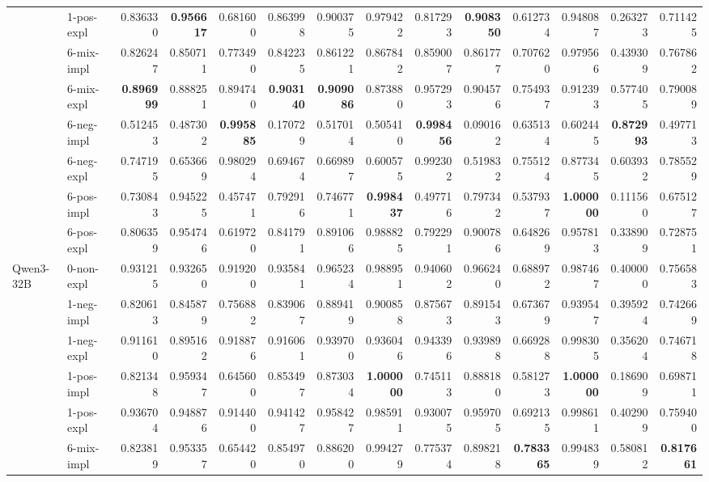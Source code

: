 \begin{tabular}{ll|rrrr|rrrr|rrrr}
 & 1-pos-expl & 0.836330 & \bfseries 0.956617 & 0.681600 & 0.863998 & 0.900375 & 0.979422 & 0.817293 & \bfseries 0.908350 & 0.612734 & 0.948087 & 0.263273 & 0.711425 \\
 & 6-mix-impl & 0.826247 & 0.850711 & 0.773490 & 0.842235 & 0.861221 & 0.867842 & 0.859007 & 0.861777 & 0.707620 & 0.979566 & 0.439309 & 0.767862 \\
 & 6-mix-expl & \bfseries 0.896999 & 0.888251 & 0.894740 & \bfseries 0.903140 & \bfseries 0.909086 & 0.873880 & 0.957293 & 0.904576 & 0.754937 & 0.912393 & 0.577405 & 0.790089 \\
 & 6-neg-impl & 0.512453 & 0.487302 & \bfseries 0.995885 & 0.170729 & 0.517014 & 0.505410 & \bfseries 0.998456 & 0.090162 & 0.635134 & 0.602445 & \bfseries 0.872993 & 0.497713 \\
 & 6-neg-expl & 0.747195 & 0.653669 & 0.980294 & 0.694674 & 0.669897 & 0.600575 & 0.992302 & 0.519832 & 0.755124 & 0.877345 & 0.603932 & 0.785529 \\
 & 6-pos-impl & 0.730843 & 0.945225 & 0.457471 & 0.792916 & 0.746771 & \bfseries 0.998437 & 0.497716 & 0.797342 & 0.537937 & \bfseries 1.000000 & 0.111560 & 0.675127 \\
 & 6-pos-expl & 0.806359 & 0.954746 & 0.619720 & 0.841791 & 0.891066 & 0.988825 & 0.792291 & 0.900786 & 0.648269 & 0.957813 & 0.338909 & 0.728751 \\
 \midrule
\multirow[t]{11}{*}{Qwen3-32B} & 0-non-expl & 0.931215 & 0.932650 & 0.919200 & 0.935841 & 0.965234 & 0.988951 & 0.940602 & 0.966240 & 0.688972 & 0.987467 & 0.400000 & 0.756583 \\
 & 1-neg-impl & 0.820613 & 0.845879 & 0.756882 & 0.839067 & 0.889419 & 0.900858 & 0.875673 & 0.891543 & 0.673679 & 0.939547 & 0.395924 & 0.742669 \\
 & 1-neg-expl & 0.911610 & 0.895162 & 0.918876 & 0.916061 & 0.939700 & 0.936046 & 0.943396 & 0.939898 & 0.669288 & 0.998305 & 0.356204 & 0.746718 \\
 & 1-pos-impl & 0.821348 & 0.959347 & 0.645600 & 0.853497 & 0.873034 & \bfseries 1.000000 & 0.745113 & 0.888180 & 0.581273 & \bfseries 1.000000 & 0.186909 & 0.698711 \\
 & 1-pos-expl & 0.936704 & 0.948876 & 0.914400 & 0.941427 & 0.958427 & 0.985911 & 0.930075 & 0.959705 & 0.692135 & 0.998611 & 0.402909 & 0.759400 \\
 & 6-mix-impl & 0.823819 & 0.953357 & 0.654420 & 0.854970 & 0.886200 & 0.994279 & 0.775374 & 0.898218 & \bfseries 0.783365 & 0.994839 & 0.580812 & \bfseries 0.817661 \\

\end{tabular}
